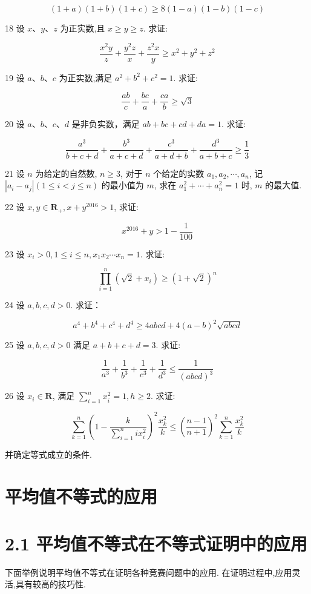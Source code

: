 $$
(1+a)(1+b)(1+c) \geqslant 8(1-a)(1-b)(1-c)
$$

18 设 $x 、 y 、 z$ 为正实数,且 $x \geqslant y \geqslant z$. 求证:

$$
\frac{x^{2} y}{z}+\frac{y^{2} z}{x}+\frac{z^{2} x}{y} \geqslant x^{2}+y^{2}+z^{2}
$$

19 设 $a 、 b 、 c$ 为正实数,满足 $a^{2}+b^{2}+c^{2}=1$. 求证:

$$
\frac{a b}{c}+\frac{b c}{a}+\frac{c a}{b} \geqslant \sqrt{3}
$$

20 设 $a 、 b 、 c 、 d$ 是非负实数，满足 $a b+b c+c d+d a=1$. 求证:

$$
\frac{a^{3}}{b+c+d}+\frac{b^{3}}{a+c+d}+\frac{c^{3}}{a+d+b}+\frac{d^{3}}{a+b+c} \geqslant \frac{1}{3}
$$

21 设 $n$ 为给定的自然数, $n \geqslant 3$, 对于 $n$ 个给定的实数 $a_{1}, a_{2}, \cdots, a_{n}$, 记 $\left|a_{i}-a_{j}\right|(1 \leqslant i<j \leqslant n)$ 的最小值为 $m$, 求在 $a_{1}^{2}+\cdots+a_{n}^{2}=1$ 时, $m$ 的最大值.

22 设 $x, y \in \mathbf{R}_{+}, x+y^{2016}>1$, 求证:

$$
x^{2016}+y>1-\frac{1}{100}
$$

23 设 $x_{i}>0,1 \leqslant i \leqslant n, x_{1} x_{2} \cdots x_{n}=1$. 求证:

$$
\prod_{i=1}^{n}\left(\sqrt{2}+x_{i}\right) \geqslant(1+\sqrt{2})^{n}
$$

24 设 $a, b, c, d>0$. 求证：

$$
a^{4}+b^{4}+c^{4}+d^{4} \geqslant 4 a b c d+4(a-b)^{2} \sqrt{a b c d}
$$

25 设 $a, b, c, d>0$ 满足 $a+b+c+d=3$. 求证:

$$
\frac{1}{a^{3}}+\frac{1}{b^{3}}+\frac{1}{c^{3}}+\frac{1}{d^{3}} \leqslant \frac{1}{(a b c d)^{3}}
$$

26 设 $x_{i} \in \mathbf{R}$, 满足 $\sum_{i=1}^{n} x_{i}^{2}=1, h \geqslant 2$. 求证:

$$
\sum_{k=1}^{n}\left(1-\frac{k}{\sum_{i=1}^{n} i x_{i}^{2}}\right)^{2} \frac{x_{k}^{2}}{k} \leqslant\left(\frac{n-1}{n+1}\right)^{2} \sum_{k=1}^{n} \frac{x_{k}^{2}}{k}
$$

并确定等式成立的条件.

\section*{平均值不等式的应用}
\section*{2.1 平均值不等式在不等式证明中的应用}
下面举例说明平均值不等式在证明各种竞赛问题中的应用. 在证明过程中,应用灵活,具有较高的技巧性.

